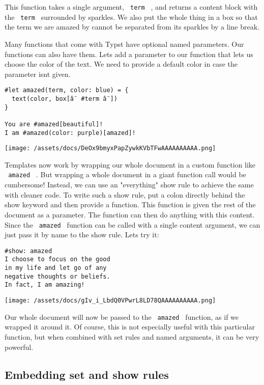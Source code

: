 This function takes a single argument, \texttt{\ term\ } , and returns a
content block with the \texttt{\ term\ } surrounded by sparkles. We also
put the whole thing in a box so that the term we are amazed by cannot be
separated from its sparkles by a line break.

Many functions that come with Typst have optional named parameters. Our
functions can also have them. Let\textquotesingle s add a parameter to
our function that lets us choose the color of the text. We need to
provide a default color in case the parameter isn\textquotesingle t
given.

\begin{verbatim}
#let amazed(term, color: blue) = {
  text(color, box[â¨ #term â¨])
}

You are #amazed[beautiful]!
I am #amazed(color: purple)[amazed]!
\end{verbatim}

\texttt{[image: /assets/docs/DeOx9bmyxPapZywkKVbTFwAAAAAAAAAA.png]}

Templates now work by wrapping our whole document in a custom function
like \texttt{\ amazed\ } . But wrapping a whole document in a giant
function call would be cumbersome! Instead, we can use an "everything"
show rule to achieve the same with cleaner code. To write such a show
rule, put a colon directly behind the show keyword and then provide a
function. This function is given the rest of the document as a
parameter. The function can then do anything with this content. Since
the \texttt{\ amazed\ } function can be called with a single content
argument, we can just pass it by name to the show rule.
Let\textquotesingle s try it:

\begin{verbatim}
#show: amazed
I choose to focus on the good
in my life and let go of any
negative thoughts or beliefs.
In fact, I am amazing!
\end{verbatim}

\texttt{[image: /assets/docs/gIv\_i\_LbdQ0VPwrL8LD78QAAAAAAAAAA.png]}

Our whole document will now be passed to the \texttt{\ amazed\ }
function, as if we wrapped it around it. Of course, this is not
especially useful with this particular function, but when combined with
set rules and named arguments, it can be very powerful.

\subsection{Embedding set and show rules}\label{set-and-show-rules}

